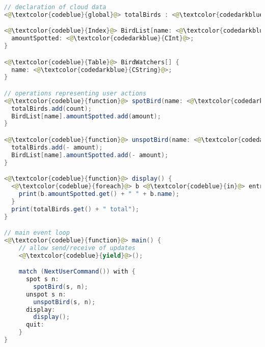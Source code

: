 %

\begin{lstlisting}[language=Java,caption={A simple birdwatching application implemented in a typed javascript-like pseudo-language},label={lst:birdwatching}, float]
// declaration of cloud data
<@\textcolor{codeblue}{global}@> totalBirds : <@\textcolor{codedarkblue}{CInt}@>;

<@\textcolor{codeblue}{Index}@> BirdList[name: <@\textcolor{codedarkblue}{String}@>] {
  amountSpotted: <@\textcolor{codedarkblue}{CInt}@>;
}

<@\textcolor{codeblue}{Table}@> BirdWatchers[] {
  name: <@\textcolor{codedarkblue}{CString}@>;
}

// operations representing user actions
<@\textcolor{codeblue}{function}@> spotBird(name: <@\textcolor{codedarkblue}{String}@>, amount: <@\textcolor{codedarkblue}{Int}@>) {
  totalBirds.add(count);
  BirdList[name].amountSpotted.add(amount);
}

<@\textcolor{codeblue}{function}@> unspotBird(name: <@\textcolor{codedarkblue}{String}@>, amount: <@\textcolor{codedarkblue}{Int}@>) {
  totalBirds.add(- amount);
  BirdList[name].amountSpotted.add(- amount);
}

<@\textcolor{codeblue}{function}@> display() {
  <@\textcolor{codeblue}{foreach}@> b <@\textcolor{codeblue}{in}@> entries BirdList.amountSpotted {
    print(b.amountSpotted.get() + " " + b.name);
  }
  print(totalBirds.get() + " total");
}

// main event loop
<@\textcolor{codeblue}{function}@> main() {
    // allow send/receive of updates
    <@\textcolor{codeblue}{yield}@>();

    match (NextUserCommand()) with {
      spot s n:
        spotBird(s, n);
      unspot s n:
        unspotBird(s, n);
      display:
        display();
      quit:
    } 
}
\end{lstlisting}